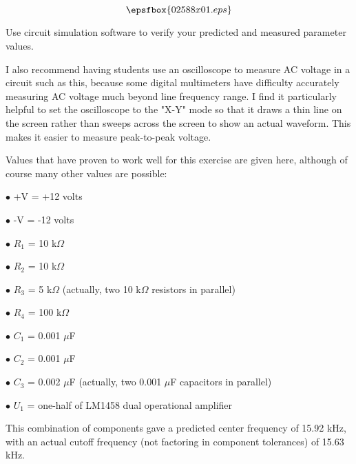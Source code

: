 

$$\epsfbox{02588x01.eps}$$

\vfil \eject






Use circuit simulation software to verify your predicted and measured parameter values.







I also recommend having students use an oscilloscope to measure AC voltage in a circuit such as this, because some digital multimeters have difficulty accurately measuring AC voltage much beyond line frequency range.  I find it particularly helpful to set the oscilloscope to the "X-Y" mode so that it draws a thin line on the screen rather than sweeps across the screen to show an actual waveform.  This makes it easier to measure peak-to-peak voltage.

Values that have proven to work well for this exercise are given here, although of course many other values are possible:

\medskip
\goodbreak
\item{$\bullet$} +V = +12 volts
\item{$\bullet$} -V = -12 volts
\item{$\bullet$} $R_1$ = 10 k$\Omega$
\item{$\bullet$} $R_2$ = 10 k$\Omega$
\item{$\bullet$} $R_3$ = 5 k$\Omega$ (actually, two 10 k$\Omega$ resistors in parallel)
\item{$\bullet$} $R_4$ = 100 k$\Omega$
\item{$\bullet$} $C_1$ = 0.001 $\mu$F
\item{$\bullet$} $C_2$ = 0.001 $\mu$F
\item{$\bullet$} $C_3$ = 0.002 $\mu$F (actually, two 0.001 $\mu$F capacitors in parallel)
\item{$\bullet$} $U_1$ = one-half of LM1458 dual operational amplifier
\medskip

This combination of components gave a predicted center frequency of 15.92 kHz, with an actual cutoff frequency (not factoring in component tolerances) of 15.63 kHz.




